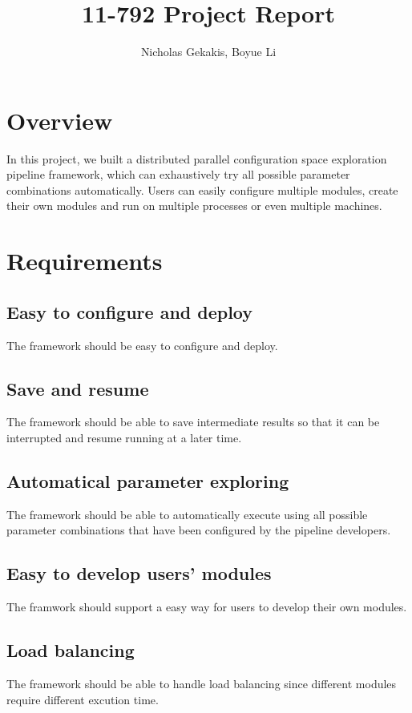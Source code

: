 \documentclass{article}
\begin{document}
\title{11-792 Project Report}

\author{Nicholas Gekakis, Boyue Li}

\maketitle

\section{Overview}

In this project, we built a distributed parallel configuration space exploration pipeline framework,
which can exhaustively try all possible parameter combinations automatically.
Users can easily configure multiple modules,
create their own modules and run on multiple processes or even multiple machines.

\section{Requirements}

    \subsection{Easy to configure and deploy}
    The framework should be easy to configure and deploy.

    \subsection{Save and resume}
    The framework should be able to save intermediate results so that it can be interrupted and resume running at a later time.

    \subsection{Automatical parameter exploring}
    The framework should be able to automatically execute using all possible parameter combinations that have been configured by the pipeline developers.

    \subsection{Easy to develop users' modules}
    The framwork should support a easy way for users to develop their own modules.

    \subsection{Load balancing}
    The framework should be able to handle load balancing since different modules require different excution time.
\end{document}
